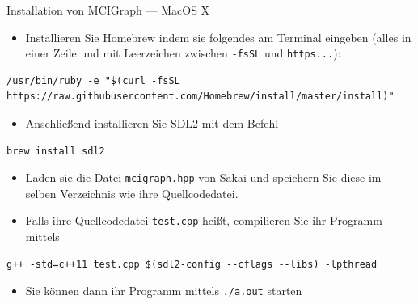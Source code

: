 \documentclass[presentation]{beamer}
\begin{document}
\begin{frame}[label={sec:orgb495597},fragile]{Installation von MCIGraph --- MacOS X}
 \begin{itemize}
\item Installieren Sie Homebrew indem sie folgendes am Terminal eingeben
(alles in einer Zeile und mit Leerzeichen zwischen {\color{solarizedYellow}\texttt{-fsSL} }und
{\color{solarizedYellow}\texttt{https...}}):
\end{itemize}
\begin{verbatim}
/usr/bin/ruby -e "$(curl -fsSL
https://raw.githubusercontent.com/Homebrew/install/master/install)"
\end{verbatim}
\begin{itemize}
\item Anschließend installieren Sie SDL2 mit dem Befehl
\end{itemize}
\begin{verbatim}
brew install sdl2
\end{verbatim}
\begin{itemize}
\item Laden sie die Datei {\color{solarizedYellow}\texttt{mcigraph.hpp} }von Sakai und speichern Sie diese
im selben Verzeichnis wie ihre Quellcodedatei.
\item Falls ihre Quellcodedatei {\color{solarizedYellow}\texttt{test.cpp} }heißt, compilieren Sie ihr
Programm mittels
\end{itemize}
\begin{verbatim}
g++ -std=c++11 test.cpp $(sdl2-config --cflags --libs) -lpthread
\end{verbatim}
\begin{itemize}
\item Sie können dann ihr Programm mittels {\color{solarizedYellow}\texttt{./a.out} }starten
\end{itemize}
\end{frame}
\end{document}
